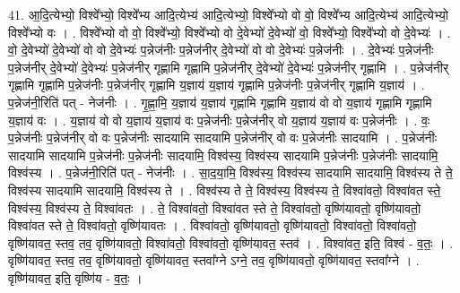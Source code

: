 \documentclass[17pt]{extarticle}
\begin{document}
41. आ॒दि॒त्येभ्यो॒ विश्वे᳚भ्यो॒ विश्वे᳚भ्य आदि॒त्येभ्य॑ आदि॒त्येभ्यो॒ विश्वे᳚भ्यो वो वो॒ विश्वे᳚भ्य आदि॒त्येभ्य॑ आदि॒त्येभ्यो॒ विश्वे᳚भ्यो वः । . विश्वे᳚भ्यो वो वो॒ विश्वे᳚भ्यो॒ विश्वे᳚भ्यो वो दे॒वेभ्यो॑ दे॒वेभ्यो॑ वो॒ विश्वे᳚भ्यो॒ विश्वे᳚भ्यो वो दे॒वेभ्यः॑ । . वो॒ दे॒वेभ्यो॑ दे॒वेभ्यो॑ वो वो दे॒वेभ्यः॑ प॒न्नेज॑नीः प॒न्नेज॑नीर् दे॒वेभ्यो॑ वो वो दे॒वेभ्यः॑ प॒न्नेज॑नीः । . दे॒वेभ्यः॑ प॒न्नेज॑नीः प॒न्नेज॑नीर् दे॒वेभ्यो॑ दे॒वेभ्यः॑ प॒न्नेज॑नीर् गृह्णामि गृह्णामि प॒न्नेज॑नीर् दे॒वेभ्यो॑ दे॒वेभ्यः॑ प॒न्नेज॑नीर् गृह्णामि । . प॒न्नेज॑नीर् गृह्णामि गृह्णामि प॒न्नेज॑नीः प॒न्नेज॑नीर् गृह्णामि य॒ज्ञाय॑ य॒ज्ञाय॑ गृह्णामि प॒न्नेज॑नीः प॒न्नेज॑नीर् गृह्णामि य॒ज्ञाय॑ । . प॒न्नेज॑नी॒रिति॑ पत् - नेज॑नीः । . गृ॒ह्णा॒मि॒ य॒ज्ञाय॑ य॒ज्ञाय॑ गृह्णामि गृह्णामि य॒ज्ञाय॑ वो वो य॒ज्ञाय॑ गृह्णामि गृह्णामि य॒ज्ञाय॑ वः । . य॒ज्ञाय॑ वो वो य॒ज्ञाय॑ य॒ज्ञाय॑ वः प॒न्नेज॑नीः प॒न्नेज॑नीर् वो य॒ज्ञाय॑ य॒ज्ञाय॑ वः प॒न्नेज॑नीः । . वः॒ प॒न्नेज॑नीः प॒न्नेज॑नीर् वो वः प॒न्नेज॑नीः सादयामि सादयामि प॒न्नेज॑नीर् वो वः प॒न्नेज॑नीः सादयामि । . प॒न्नेज॑नीः सादयामि सादयामि प॒न्नेज॑नीः प॒न्नेज॑नीः सादयामि॒ विश्व॑स्य॒ विश्व॑स्य सादयामि प॒न्नेज॑नीः प॒न्नेज॑नीः सादयामि॒ विश्व॑स्य । . प॒न्नेज॑नी॒रिति॑ पत् - नेज॑नीः । . सा॒द॒या॒मि॒ विश्व॑स्य॒ विश्व॑स्य सादयामि सादयामि॒ विश्व॑स्य ते ते॒ विश्व॑स्य सादयामि सादयामि॒ विश्व॑स्य ते । . विश्व॑स्य ते ते॒ विश्व॑स्य॒ विश्व॑स्य ते॒ विश्वा॑वतो॒ विश्वा॑वत स्ते॒ विश्व॑स्य॒ विश्व॑स्य ते॒ विश्वा॑वतः । . ते॒ विश्वा॑वतो॒ विश्वा॑वत स्ते ते॒ विश्वा॑वतो॒ वृष्णि॑यावतो॒ वृष्णि॑यावतो॒ विश्वा॑वत स्ते ते॒ विश्वा॑वतो॒ वृष्णि॑यावतः । . विश्वा॑वतो॒ वृष्णि॑यावतो॒ वृष्णि॑यावतो॒ विश्वा॑वतो॒ विश्वा॑वतो॒ वृष्णि॑यावत॒ स्तव॒ तव॒ वृष्णि॑यावतो॒ विश्वा॑वतो॒ विश्वा॑वतो॒ वृष्णि॑यावत॒ स्तव॑ । . विश्वा॑वत॒ इति॒ विश्व॑ - व॒तः॒ । . वृष्णि॑यावत॒ स्तव॒ तव॒ वृष्णि॑यावतो॒ वृष्णि॑यावत॒ स्तवा᳚ग्ने ऽग्ने॒ तव॒ वृष्णि॑यावतो॒ वृष्णि॑यावत॒ स्तवा᳚ग्ने । . वृष्णि॑यावत॒ इति॒ वृष्णि॑य - व॒तः॒ । \newline
\pagebreak
{}
\end{document}
